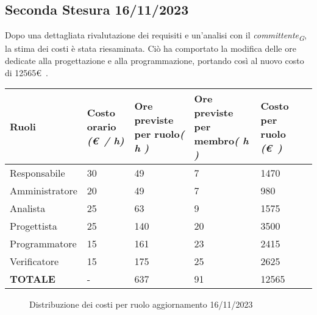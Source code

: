 \subsection{Seconda Stesura 16/11/2023}\label{sec:SecondaStesura}
Dopo una dettagliata rivalutazione dei requisiti e un'analisi con il \textit{committente}\textsubscript{\textit{G}}, la stima dei costi è stata riesaminata. Ciò ha comportato la modifica delle ore dedicate alla progettazione e alla programmazione, portando così al nuovo costo di 12565\euro\ .
\begin{center}
    \begin{tabular}{|C{3cm}|C{2cm}|C{2cm}|C{2cm}|C{2cm}|C{2cm}|}
        \hline  

        \textbf{Ruoli}  & \textbf{Costo orario} \linebreak \textit{(\euro\ / h)} & \textbf{Ore previste per ruolo}\linebreak \textit{( h )} & \textbf{Ore previste per membro}\linebreak \textit{( h )} & \textbf{Costo per ruolo} \linebreak \textit{(\euro\ )} \\
        \hline\hline

        Responsabile & 30 & 49 & 7 & 1470 \\
        \hline
        Amministratore & 20 & 49 & 7 & 980 \\
        \hline
        Analista & 25 & 63 & 9 & 1575 \\
        \hline
        Progettista & 25 & 140 & 20 & 3500 \\
        \hline
        Programmatore & 15 & 161 & 23 & 2415 \\
        \hline
        Verificatore & 15 & 175 & 25 & 2625 \\
        \hline\hline

        \textbf{TOTALE} & - & 637 & 91 & 12565 \\
        \hline
    \end{tabular}
\end{center}

\vspace{1.5cm}

\begin{figure}[H]
    \centering
    \caption{Distribuzione dei costi per ruolo aggiornamento 16/11/2023}
\end{figure}

\pagebreak
